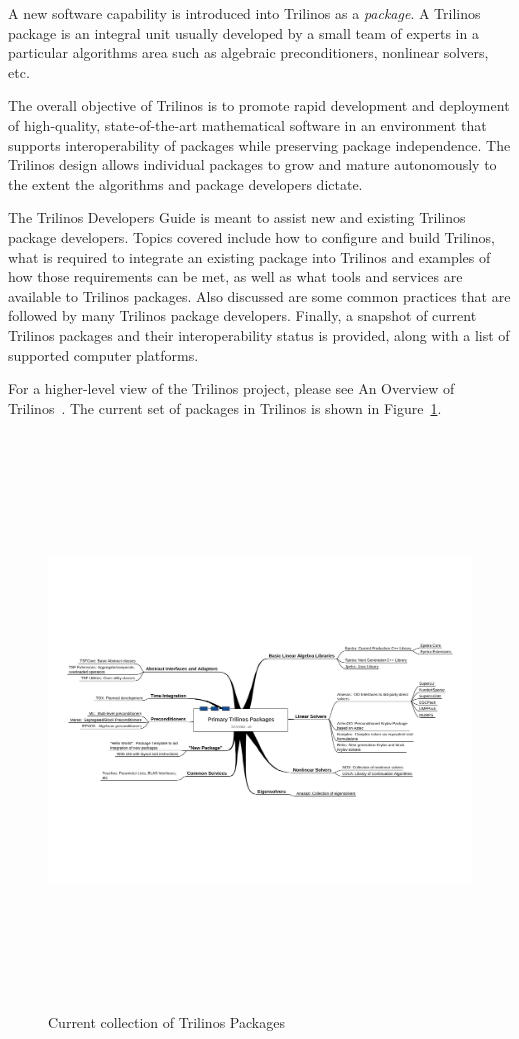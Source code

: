 \documentclass[12pt,relax]{TrilinosDevGuide}
\begin{document}
A new software capability is introduced into Trilinos as a {\it
package}.  A Trilinos package is an integral unit usually developed by
a small team of experts in a particular algorithms area such as
algebraic preconditioners, nonlinear solvers, etc.

The overall objective of Trilinos is to promote rapid development and
deployment of high-quality, state-of-the-art mathematical software in
an environment that supports interoperability of packages while
preserving package independence.  The Trilinos design allows 
individual packages to grow and mature autonomously to the extent the 
algorithms and package developers dictate. 

The Trilinos Developers Guide is meant to assist new and existing
Trilinos package developers.  Topics covered include how to configure and 
build Trilinos, what is required to integrate an existing package into Trilinos
and examples of how those requirements can be met, as well as what
tools and services are 
available to Trilinos packages.  Also discussed are some common practices that 
are followed by many Trilinos package developers.  Finally, a snapshot
of current Trilinos packages and their interoperability status
is provided, along with a list of supported computer platforms.

For a higher-level view of the Trilinos project, please see An Overview
of Trilinos~\cite{Trilinos-Overview}.  The current set of
packages in Trilinos is shown in Figure~\ref{Figure:TrilinosPackages}.

\begin{figure}
\begin{center}
\includegraphics[height=6in,angle=90]{../CommonFiles/TrilinosPackagesDiagram}
\end{center}
\caption{\label{Figure:TrilinosPackages}Current collection of Trilinos Packages}
\end{figure}
\end{document}
